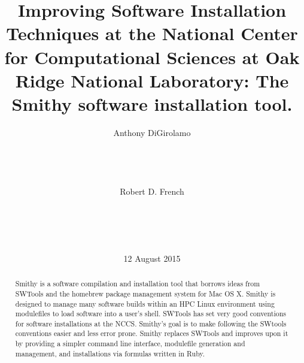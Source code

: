 \documentclass{acm_proc_article-sp}
\begin{document}
\title{Improving Software Installation Techniques at the National Center for Computational Sciences at Oak Ridge National Laboratory: The Smithy software installation tool.}


%
\author{
\alignauthor
Anthony DiGirolamo\\ %
       \\
       \\
       \\
       \\
\alignauthor
Robert D. French\\ %
       \\
       \\
       \\
       \\
}

\date{12 August 2015}

\maketitle

\begin{abstract}

Smithy is a software compilation and installation tool that borrows ideas from
SWTools\cite{swtools} and the homebrew\cite{homebrew} package management system
for Mac OS X.  Smithy is designed to manage many software builds within an HPC
Linux environment using modulefiles to load software into a user's shell.
SWTools has set very good conventions for software installations at the NCCS.
Smithy's goal is to make following the SWtools conventions easier and less error
prone.  Smithy replaces SWTools and improves upon it by providing a simpler
command line interface, modulefile generation and management, and installations
via formulas written in Ruby.

\end{abstract}
\end{document}
